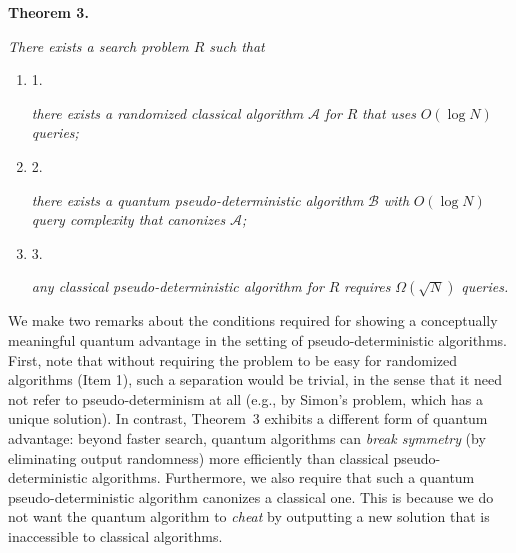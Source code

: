 

\par\medskip\noindent\textbf{
\textbf{Theorem 3}\textbf{.}
}\par



\emph{There exists a search problem ${R}$ such that}\par


\begin{enumerate}


\item[] 
1. 


\emph{there exists a randomized classical algorithm }$\mathcal{A}$\emph{ for }${R}$\emph{ that uses }$O(\log N)$\emph{ queries;}\par





\item[] 
2. 


\emph{there exists a quantum pseudo-deterministic algorithm }$\mathcal{B}$\emph{ with }$O(\log N)$\emph{ query complexity that canonizes }$\mathcal{A}$\emph{;}\par





\item[] 
3. 


\emph{any classical pseudo-deterministic algorithm for }${R}$\emph{ requires }$\Omega(\sqrt{N})$\emph{ queries.}\par





\end{enumerate}






We make two remarks about the conditions required for showing a conceptually meaningful quantum advantage in the setting of pseudo-deterministic algorithms. First, note that without requiring the problem to be easy for randomized algorithms (Item 1), such a separation would be trivial, in the sense that it need not refer to pseudo-determinism at all (e.g., by Simon’s problem, which has a unique solution). In contrast, Theorem 3 exhibits a different form of quantum advantage: beyond faster search, quantum algorithms can \emph{break symmetry} (by eliminating output randomness) more efficiently than classical pseudo-deterministic algorithms.
Furthermore, we also require that such a quantum pseudo-deterministic algorithm canonizes a classical one. This is because we do not want the quantum algorithm to \emph{cheat} by outputting a new solution that is inaccessible to classical algorithms.\par






